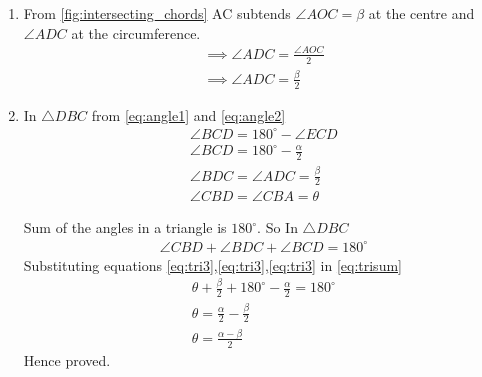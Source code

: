 \begin{enumerate}[label=\thesection.\arabic*.,ref=\thesection.\theenumi]
\item From \ref{fig:intersecting_chords} AC subtends $\angle AOC = \beta$ at the centre and $\angle ADC$ at the circumference.
\begin{align}
\implies \angle ADC = \frac{\angle AOC}{2}
\\
\implies \angle ADC = \frac{\beta}{2}
\label{eq:angle2}
\end{align}


\item In $\triangle DBC$ from \ref{eq:angle1} and \ref{eq:angle2}
\begin{align}
\angle BCD = 180^{\circ} - \angle ECD
\\
\angle BCD = 180^{\circ} - \frac{\alpha}{2}
\label{eq:tri1}
\\
\angle BDC = \angle ADC = \frac{\beta}{2}
\label{eq:tri2}
\\
\angle CBD = \angle CBA = \theta
\label{eq:tri3}
\end{align}

Sum of the angles in a triangle is $180^{\circ}$. So In $\triangle DBC$
\begin{align}
\angle CBD + \angle BDC + \angle BCD = 180^{\circ}
\label{eq:trisum}
\end{align}
Substituting equations \ref{eq:tri3},\ref{eq:tri3},\ref{eq:tri3} in \ref{eq:trisum}
\begin{align}
\theta + \frac{\beta}{2} + 180^{\circ} - \frac{\alpha}{2} = 180^{\circ}
\\
\theta = \frac{\alpha}{2} - \frac{\beta}{2}
\\
\theta = \frac{\alpha - \beta}{2} 
\end{align}
Hence proved.
\end{enumerate}

